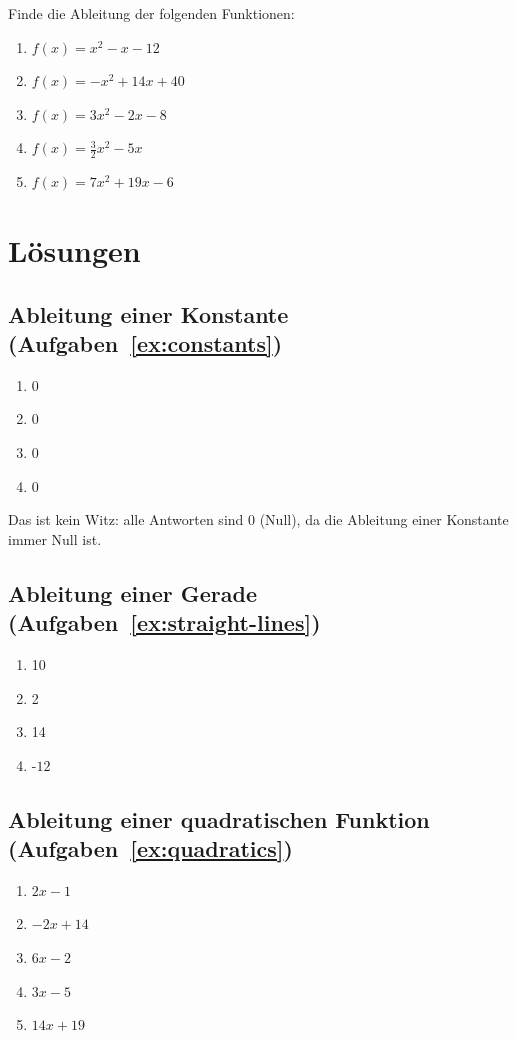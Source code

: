 \documentclass{scrartcl}
\begin{document}
Finde die Ableitung der folgenden Funktionen:

\begin{enumerate}
    \item $f(x) = x^2 - x - 12$
    \item $f(x) = -x^2 + 14x + 40$
    \item $f(x) = 3x^2 - 2x - 8$
    \item $f(x) = \frac{3}{2}x^2 - 5x$
    \item $f(x) = 7x^2 + 19x - 6$
\end{enumerate}

\newpage

\section{Lösungen}

\subsection*{Ableitung einer Konstante (Aufgaben~\ref{ex:constants})}

\begin{enumerate}
    \item 0
    \item 0
    \item 0
    \item 0
\end{enumerate}

Das ist kein Witz: alle Antworten sind 0 (Null), da die Ableitung einer
Konstante immer Null ist.

\subsection*{Ableitung einer Gerade (Aufgaben~\ref{ex:straight-lines})}

\begin{enumerate}
    \item 10
    \item 2
    \item 14
    \item -$12$
\end{enumerate}

\subsection*{Ableitung einer quadratischen Funktion (Aufgaben~\ref{ex:quadratics})}

\begin{enumerate}
    \item $2x - 1$
    \item $-2x + 14$
    \item $6x - 2$
    \item $3x - 5$
    \item $14x + 19$
\end{enumerate}
\end{document}
